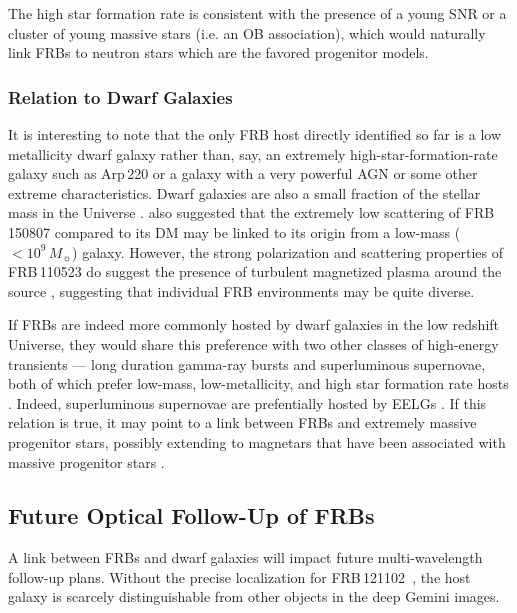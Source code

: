 \documentclass[twocolumn]{aastex61}
\def \frb {FRB\,121102}
\begin{document}
The high star formation rate is consistent with the presence of a young SNR or a cluster of young massive stars (i.e. an OB association), which would naturally link FRBs to neutron stars which are the favored progenitor models.


\subsubsection{Relation to Dwarf Galaxies}
It is interesting to note that the only FRB host directly identified so far is a low metallicity dwarf galaxy rather than, say, an extremely high-star-formation-rate galaxy such as Arp\,220 or a galaxy with a very powerful AGN or some other extreme characteristics. Dwarf galaxies are also a small fraction of the stellar mass in the Universe \citep{pch+12}. \citet{rsb+16} also suggested that the extremely low scattering of FRB\,150807 compared to its DM may be linked to its origin from a low-mass ($<10^{9}\,M_\sun$) galaxy. However, the strong polarization and scattering properties of FRB\,110523 do suggest the presence of turbulent magnetized plasma around the source \citep{mls+15}, suggesting that individual FRB environments may be quite diverse.




If FRBs are indeed more commonly hosted by dwarf galaxies in the low redshift Universe, they would share this preference with two other classes of high-energy transients --- long duration gamma-ray bursts and superluminous supernovae, both of which prefer low-mass, low-metallicity, and high star formation rate hosts \citep[e.g., ][ and other works]{fls+06,plt+13,vsj+15,pqy+16}. Indeed, superluminous supernovae are prefentially hosted by EELGs \citep{lsk+15}. If this relation is true, it may point to a link between FRBs and extremely massive progenitor stars, possibly extending to magnetars that have been associated with massive progenitor stars \citep[e.g.  ][]{ok14}.



\subsection{Future Optical Follow-Up of FRBs}
A link between FRBs and dwarf galaxies will impact future multi-wavelength follow-up plans. Without the precise localization for \frb\ \citep{clw+16}, the host galaxy is scarcely distinguishable from other objects in the deep Gemini images. 
\end{document}

